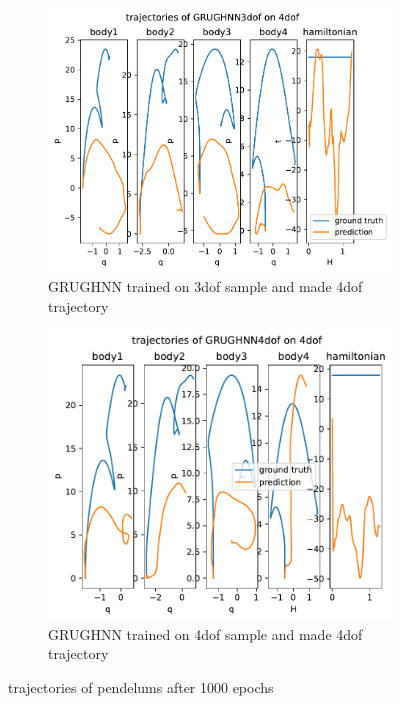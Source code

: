 \begin{figure}[htbp]
	\vspace{0.5cm}
	\begin{subfigure}[b]{0.45\textwidth}
		\centering
		\includegraphics[width=\textwidth]{chapters/chapter5/traj_3dof4_pend.pdf} %
		\caption{GRUGHNN trained on 3dof sample and made 4dof trajectory}
		\label{fig:sub3}
	\end{subfigure}
	\hfill
	\begin{subfigure}[b]{0.45\textwidth}
		\centering
		\includegraphics[width=\textwidth]{chapters/chapter5/traj_4dof4_pend.pdf} %
		\caption{GRUGHNN trained on 4dof sample and made 4dof trajectory}
		\label{fig:sub4}
	\end{subfigure}
	
	\caption{trajectories of pendelums after 1000 epochs}
	\label{pend_traj}
\end{figure}

